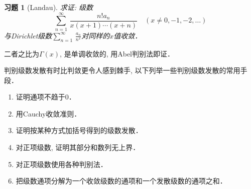 \documentclass[11pt,a4paper]{ctexart}
\makeatletter
\theoremstyle{thmseries} %
\theoremstyle{exerseries}
\newtheorem{exer}{习题}[section]
\renewenvironment{proof}[1][\proofname]{\par
  \pushQED{\qed}%
  \normalfont \topsep6\p@\@plus6\p@\relax
  \trivlist
  \item[\hskip\labelsep
        \itshape
    #1\@addpunct{}]\ignorespaces
}{%
  \popQED\endtrivlist\@endpefalse
}
\newenvironment{pf}{\begin{proof}[\bfseries\upshape 证\quad]}{\end{proof}}
\def \tseries {{\textstyle\sum\limits_{n=1}^{\infty}}\,} %
\def \dseries {\sum_{n=1}^{\infty}\,} %
\makeatother
\begin{document}
\begin{exer}[Landau]
	求证: 级数
	\[\dseries\frac{n!a_n}{x(x+1)\cdots(x+n)}\quad(x\neq0,-1,-2,\dots)\]
	与Dirichlet级数$\tseries\frac{a_n}{n^x}$对同样的$x$值收敛．
\end{exer}
\begin{pf}
	二者之比为$\Gamma(x)$, 是单调收敛的, 用Abel判别法即证．
\end{pf}

判别级数发散有时比判敛更令人感到棘手, 以下列举一些判别级数发散的常用手段．
\begin{enumerate}
	\item 证明通项不趋于$0$．
	\item 用Cauchy收敛准则．
	\item 证明按某种方式加括号得到的级数发散．
	\item 对正项级数, 证明其部分和数列无上界．
	\item 对正项级数使用各种判别法．
	\item 把级数通项分解为一个收敛级数的通项和一个发散级数的通项之和．
\end{enumerate}
\end{document}
